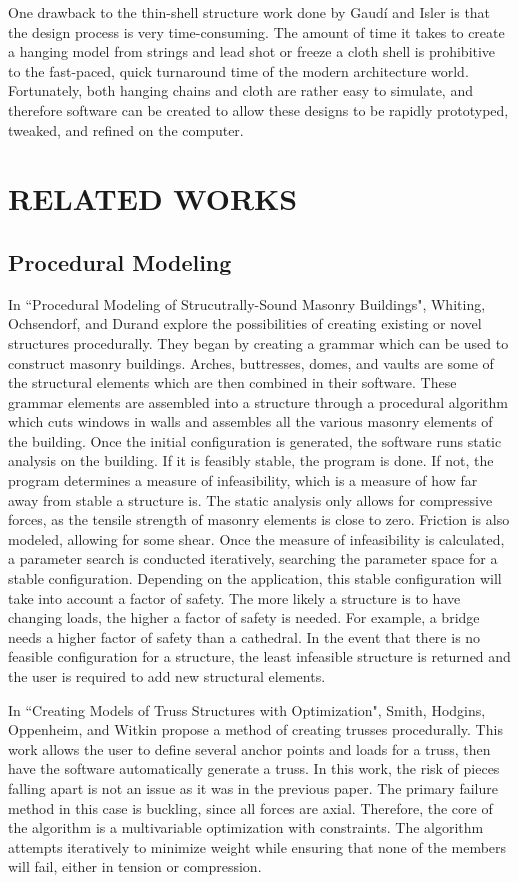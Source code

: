 \documentclass{thesis}
\begin{document}
One drawback to the thin-shell structure work done by Gaud\'{i} and Isler is that the design process is very time-consuming.  The amount of time
it takes to create a hanging model from strings and lead shot or freeze a cloth shell is prohibitive to the fast-paced, quick turnaround time of
the modern architecture world.  Fortunately, both hanging chains and cloth are rather easy to simulate, and therefore software can be created to
allow these designs to be rapidly prototyped, tweaked, and refined on the computer.

\clearpage
\chapter{RELATED WORKS}
\section{Procedural Modeling}
In ``Procedural Modeling of Strucutrally-Sound Masonry Buildings"\cite{whiting:2009}, Whiting, Ochsendorf, and Durand explore
the possibilities of creating existing or novel structures procedurally.  They began by creating a grammar
which can be used to construct masonry buildings.  Arches, buttresses, domes, and vaults are some of the
structural elements which are then combined in their software.  These grammar elements are assembled into
a structure through a procedural algorithm which cuts windows in walls and assembles
all the various masonry elements of the building.  Once the initial configuration is
generated, the software runs static analysis on the building.  If it is feasibly stable, the program is
done.  If not, the program determines a measure of infeasibility, which is a measure of how far away from
stable a structure is.  The static analysis only allows for compressive forces, as the tensile strength of
masonry elements is close to zero.  Friction is also modeled, allowing for some shear.  Once the measure
of infeasibility is calculated, a parameter search is conducted iteratively, searching the parameter space
for a stable configuration.  Depending on the application, this stable configuration will take into account
a factor of safety.  The more likely a structure is to have changing loads, the higher a factor of
safety is needed.  For example, a bridge needs a higher factor of safety than a cathedral.  In the event
that there is no feasible configuration for a structure, the least infeasible structure is returned and the
user is required to add new structural elements.

In ``Creating Models of Truss Structures with Optimization"\cite{Carnegie02creatingmodels}, Smith, Hodgins, Oppenheim, and Witkin propose
a method of creating trusses procedurally.  This work allows the user to define several anchor points
and loads for a truss, then have the software automatically generate a truss.  In this work, the risk
of pieces falling apart is not an issue as it was in the previous paper.  The primary failure method
in this case is buckling, since all forces are axial.  Therefore, the core of the algorithm is a
multivariable optimization with constraints.  The algorithm attempts iteratively to minimize weight
while ensuring that none of the members will fail, either in tension or compression.
\end{document}
